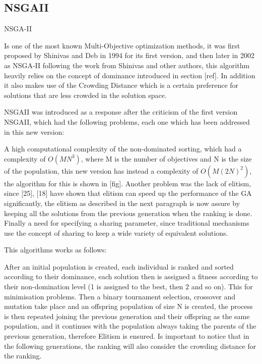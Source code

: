 
\subsection{NSGAII}

NSGA-II

Is one of the most known Multi-Objective optimization methods, it was first proposed by Shinivas and Deb in 1994 for its first version, and then later in 2002 as NSGA-II following the work from Shinivas and other authors, this algorithm heavily relies on the concept of dominance introduced in section [ref]. In addition it also makes use of the Crowding Distance which is a certain preference for solutions that are less crowded in the solution space.

NSGAII was introduced as a response after the criticism of the first version NSGAII, which had the following problems, each one which has been addressed in this new version:

A high computational complexity of the non-dominated sorting, which had a complexity of $O(MN^3)$, where M is the number of objectives and N is the size of the population, this new version has instead a complexity of $O(M(2N)^2)$, the algorithm for this is shown in [fig]. Another problem was the lack of elitism, since [25], [18] have shown that elitism can speed up the performance of the GA significantly, the elitism as described in the next paragraph is now assure by keeping all the solutions from the previous generation when the ranking is done. Finally a need for specifying a sharing parameter, since traditional mechanisms use the concept of sharing to keep a wide variety of equivalent solutions.

This algorithms works as follows:

After an initial population is created, each individual is ranked and sorted according to their dominance, each solution then is assigned a fitness according to their non-domination level (1 is assigned to the best, then 2 and so on). This for minimisation problems. Then a binary tournament selection, crossover and mutation take place and an offspring population of size N is created, the process is then repeated joining the previous generation and their offspring as the same population, and it continues with the population always taking the parents of the previous generation, therefore Elitism is ensured. Is important to notice that in the following generations, the ranking will also consider the crowding distance for the ranking.


